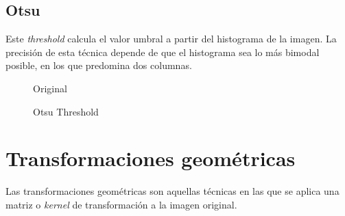 \subsection{Otsu}\label{tecnica:threshold-otsu}
Este \emph{threshold} calcula el valor umbral a partir del histograma
de la imagen. La precisión de esta técnica depende de que el
histograma sea lo más bimodal posible, en los que predomina dos
columnas.

\begin{figure}[H]
  \caption{Original}
  \centering \setlength\fboxsep{0pt} \setlength\fboxrule{0.5pt}
\end{figure}

\begin{figure}[H]
  \centering \setlength\fboxsep{0pt} \setlength\fboxrule{0.5pt}
  \caption{Otsu Threshold}
\end{figure}

\section{Transformaciones geométricas}
Las transformaciones geométricas son aquellas técnicas en las que se
aplica una matriz o \emph{kernel} de transformación a la imagen
original.
